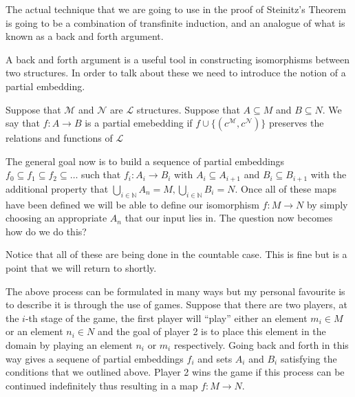 The actual technique that we are going to use in the proof of Steinitz's
Theorem is going to be a combination of transfinite induction, and an analogue
of what is known as a back and forth argument.

A back and forth argument is a useful tool in constructing isomorphisms between
two structures. In order to talk about these we need to introduce the notion of
a partial embedding.

\begin{defn}
  Suppose that $\mathcal{M}$ and $\mathcal{N}$ are $\mathcal{L}$ structures.
  Suppose that $A \subseteq M$ and $B \subseteq N$. We say that $f: A \to B$ is
  a partial emebedding if $f \cup \{(c^{\mathcal{M}}, c^{\mathcal{N}})\}$
  preserves the relations and functions of $\mathcal{L}$ 
\end{defn}

The general goal now is to build a sequence of partial embeddings $f_{0}
\subseteq f_{1} \subseteq f_{2} \subseteq \ldots$ such that $f_{i}: A_{i}
\to B_{i}$ with $A_{i} \subseteq A_{i + 1}$ and $B_{i} \subseteq B_{i + 1}$
with the additional property that $\bigcup_{i \in \mathbb{N}} A_n = M,
\bigcup_{i \in \mathbb{N}} B_{i} = N$. Once all of these maps have been defined
we will be able to define our isomorphism $f: M \to N$ by simply choosing an
appropriate $A_{n}$ that our input lies in. The question now becomes how do we
do this?

\begin{remark}
  Notice that all of these are being done in the countable case. This is fine
  but is a point that we will return to shortly.
\end{remark}

The above process can be formulated in many ways but my personal favourite is
to describe it is through the use of games. Suppose that there are two players,
at the $i$-th stage of the game, the first player will ``play'' either an
element $m_{i} \in M$ or an element $n_{i} \in N$ and the goal of player 2 is
to place this element in the domain by playing an element $n_{i}$ or $m_{i}$
respectively. Going back and forth in this way gives a sequene of partial
embeddings $f_{i}$ and sets $A_{i}$ and $B_{i}$ satisfying the conditions that
we outlined above. Player 2 wins the game if this process can be continued
indefinitely thus resulting in a map $f: M \to N$. 


